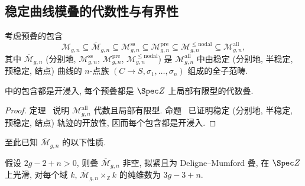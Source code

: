 \subsection{稳定曲线模叠的代数性与有界性}\label{src:6.4.3-subsection}
考虑预叠的包含
\begin{equation}\label{src:6.4.14}
\mathcal M_{g,n}\subseteq\overline{\mathcal M}_{g,n}\subseteq\mathcal M_{g,n}^{\mathrm{ss}}\subseteq\mathcal M_{g,n}^{\mathrm{pre}}\subseteq\mathcal M_{g,n}^{\leq\mathrm{nodal}}\subseteq\mathcal M_{g,n}^{\mathrm{all}},
\end{equation}
其中 $\overline{\mathcal M}_{g,\allowbreak n}$ (分别地, $\mathcal M_{g,\allowbreak n}^{\mathrm{ss}}$, $\mathcal M_{g,\allowbreak n}^{\mathrm{pre}}$, $\mathcal M_{g,\allowbreak n}^{\leq\mathrm{nodal}}$) 是 $\mathcal M_{g,\allowbreak n}^{\mathrm{all}}$ 中由稳定 (分别地, 半稳定, 预稳定, 结点) 曲线的 $n$-点族 $(C\to\allowbreak S,\allowbreak \sigma_1,\allowbreak \ldots,\allowbreak \sigma_n)$ 组成的全子范畴.
\begin{corollary}\label{src:6.4.15}
 中的包含都是开浸入, 每个预叠都是 $\Spec\mathbb Z$ 上局部有限型的代数叠.
\end{corollary}
\begin{proof}
定理~ 说明 $\mathcal M_{g,\allowbreak n}^{\mathrm{all}}$ 代数且局部有限型. 命题~ 已证明稳定 (分别地, 半稳定, 预稳定, 结点) 轨迹的开放性, 因而每个包含都是开浸入.
\end{proof}
至此已知 $\overline{\mathcal M}_{g,\allowbreak n}$ 的以下性质.
\begin{theorem}\label{src:6.4.16}
假设 $2g-2+n>0$, 则叠 $\overline{\mathcal M}_{g,\allowbreak n}$ 非空, 拟紧且为 Deligne--Mumford 叠, 在 $\Spec\mathbb Z$ 上光滑, 对每个域 $k$, $\overline{\mathcal M}_{g,\allowbreak n}\times_{\mathbb Z}k$ 的纯维数为 $3g-3+n$.
\end{theorem}
